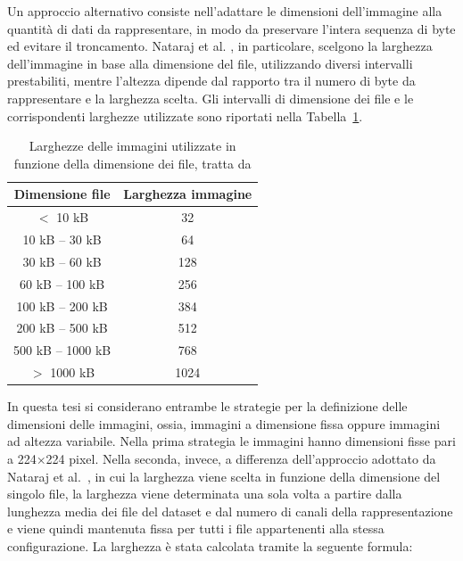 Un approccio alternativo consiste nell'adattare le dimensioni
dell'immagine alla quantità di dati da rappresentare, in modo da
preservare l'intera sequenza di byte ed evitare il troncamento.
Nataraj et al. \cite{nataraj2011}, in particolare, scelgono la
larghezza dell'immagine in base alla dimensione del file, utilizzando
diversi intervalli prestabiliti, mentre l'altezza dipende dal rapporto
tra il numero di byte da rappresentare e la larghezza scelta.
Gli intervalli di dimensione dei file e le corrispondenti larghezze utilizzate sono riportati nella Tabella~\ref{tab:nataraj_widths}.

\begin{table}[H]
    \centering
    \small
    \caption{Larghezze delle immagini utilizzate in funzione della dimensione dei file, tratta da \cite{nataraj2011}}
    \label{tab:nataraj_widths}
    \renewcommand{\arraystretch}{1.25}
    \begin{tabular}{cc}
        \toprule
        \textbf{Dimensione file} & \textbf{Larghezza immagine} \\
        \midrule
        $<$ 10 kB          & 32   \\
        10 kB -- 30 kB     & 64   \\
        30 kB -- 60 kB     & 128  \\
        60 kB -- 100 kB    & 256  \\
        100 kB -- 200 kB   & 384  \\
        200 kB -- 500 kB   & 512  \\
        500 kB -- 1000 kB  & 768  \\
        $>$ 1000 kB        & 1024 \\
        \bottomrule
    \end{tabular}
\end{table}

\noindent In questa tesi si considerano entrambe le strategie per la definizione delle
dimensioni delle immagini, ossia, immagini a dimensione fissa oppure immagini ad
altezza variabile. Nella prima strategia le immagini hanno
dimensioni fisse pari a 224×224 pixel.
Nella seconda, invece, a differenza dell'approccio adottato da Nataraj et al.~\cite{nataraj2011},
in cui la larghezza viene scelta in funzione della dimensione del singolo file,
la larghezza viene determinata una sola volta a partire dalla lunghezza media
dei file del dataset e dal numero di canali della rappresentazione e viene
quindi mantenuta fissa per tutti i file appartenenti alla stessa configurazione.
La larghezza è stata calcolata tramite la seguente formula:

